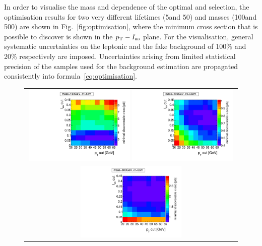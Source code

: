 In order to visualise the mass and \ctau dependence of the optimal \pt and \ias selection, the optimisation results for two very different lifetimes (5\cm and 50\cm) and masses (100\gev and 500\gev) are shown in Fig.~\ref{fig:optimisation}, where the minimum cross section that is possible to discover is shown in the $p_{\text{T}}-I_{\text{as}}$ plane.
For the visualisation, general systematic uncertainties on the leptonic and the fake background of 100\% and 20\% respectively are imposed.
Uncertainties arising from limited statistical precision of the samples used for the background estimation are propagated consistently into formula~\ref{eq:optimisation}.
\begin{figure}[!h]
  \centering 
  \vspace{50pt}
  \begin{tabular}{c}
    \includegraphics[width=0.49\textwidth]{figures/analysis/Optimisation/Madgraph_signal_mass_100_ctau_5cm_ECaloLe5_SOverDeltaBStatPlusSys.pdf} 
    \includegraphics[width=0.49\textwidth]{figures/analysis/Optimisation/Madgraph_signal_mass_100_ctau_50cm_ECaloLe5_SOverDeltaBStatPlusSys.pdf}\\ 
    \includegraphics[width=0.49\textwidth]{figures/analysis/Optimisation/Madgraph_signal_mass_500_ctau_5cm_ECaloLe5_SOverDeltaBStatPlusSys.pdf}

\end{tabular}
\end{figure}
